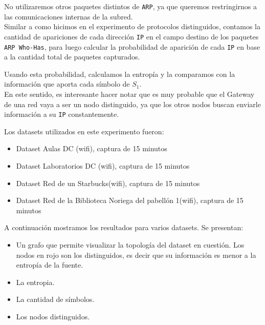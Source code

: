 No utilizaremos otros paquetes distintos de \texttt{ARP}, ya que queremos restringirnos a las comunicaciones internas de la subred. \\

Similar a como hicimos en el experimento de protocolos distinguidos, contamos la cantidad de apariciones de cada dirección \texttt{IP} en el campo destino de los paquetes \texttt{ARP Who-Has}, para luego calcular la probabilidad de aparición de cada \texttt{IP} en base a la cantidad total de paquetes capturados.

Usando esta probabilidad, calculamos la entropía y la comparamos con la información que aporta cada símbolo de $S_1$.\\

En este sentido, es interesante hacer notar que es muy probable que el Gateway de una red vaya a ser un nodo distinguido,
    ya que los otros nodos buscan enviarle información a su  \texttt{IP} constantemente.

\vspace{0.5em}


Los datasets utilizados en este experimento fueron: \\

\begin{itemize}
    \item Dataset Aulas DC (wifi), captura de 15 minutos
    \item Dataset Laboratorios DC (wifi), captura de 15 minutos
    \item Dataset Red de un Starbucks(wifi), captura de 15 minutos
    \item Dataset Red de la Biblioteca Noriega del pabellón 1(wifi), captura de 15 minutos
\end{itemize}

\vspace{0.5em}

A continuación mostramos los resultados para varios datasets. Se presentan:

\begin{itemize}
    \item Un grafo que permite visualizar la topología del dataset en cuestión. Los nodos en rojo son los distinguidos, es decir que su información es menor a la entropía de la fuente.
    \item La entropia.
    \item La cantidad de símbolos.
    \item Los nodos distinguidos.
\end{itemize}

